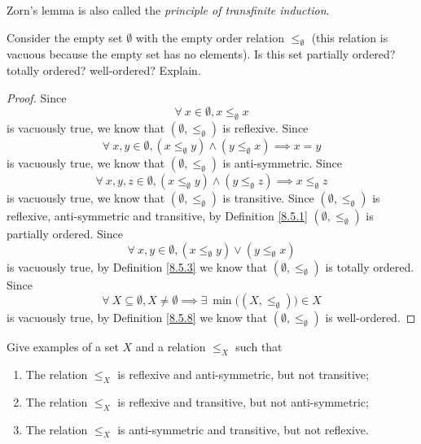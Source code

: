 \begin{note}
    Zorn's lemma is also called the \emph{principle of transfinite induction}.
\end{note}

\exercisesection

\begin{exercise}\label{ex 8.5.1}
    Consider the empty set \(\emptyset\) with the empty order relation \(\leq_\emptyset\)
    (this relation is vacuous because the empty set has no elements).
    Is this set partially ordered? totally ordered? well-ordered? Explain.
\end{exercise}

\begin{proof}
    Since
    \[
        \forall\ x \in \emptyset, x \leq_{\emptyset} x
    \]
    is vacuously true, we know that \((\emptyset, \leq_{\emptyset})\) is reflexive.
    Since
    \[
        \forall\ x, y \in \emptyset, (x \leq_{\emptyset} y) \land (y \leq_{\emptyset} x) \implies x = y
    \]
    is vacuously true, we know that \((\emptyset, \leq_{\emptyset})\) is anti-symmetric.
    Since
    \[
        \forall\ x, y, z \in \emptyset, (x \leq_{\emptyset} y) \land (y \leq_{\emptyset} z) \implies x \leq_{\emptyset} z
    \]
    is vacuously true, we know that \((\emptyset, \leq_{\emptyset})\) is transitive.
    Since \((\emptyset, \leq_{\emptyset})\) is reflexive, anti-symmetric and transitive, by Definition \ref{8.5.1} \((\emptyset, \leq_{\emptyset})\) is partially ordered.
    Since
    \[
        \forall\ x, y \in \emptyset, (x \leq_{\emptyset} y) \lor (y \leq_{\emptyset} x)
    \]
    is vacuously true, by Definition \ref{8.5.3} we know that \((\emptyset, \leq_{\emptyset})\) is totally ordered.
    Since
    \[
        \forall\ X \subseteq \emptyset, X \neq \emptyset \implies \exists\ \min\big((X, \leq_{\emptyset})\big) \in X
    \]
    is vacuously true, by Definition \ref{8.5.8} we know that \((\emptyset, \leq_{\emptyset})\) is well-ordered.
\end{proof}

\begin{exercise}\label{ex 8.5.2}
    Give examples of a set \(X\) and a relation \(\leq_X\) such that
    \begin{enumerate}
        \item The relation \(\leq_X\) is reflexive and anti-symmetric, but not transitive;
        \item The relation \(\leq_X\) is reflexive and transitive, but not anti-symmetric;
        \item The relation \(\leq_X\) is anti-symmetric and transitive, but not reflexive.
    \end{enumerate}
\end{exercise}

